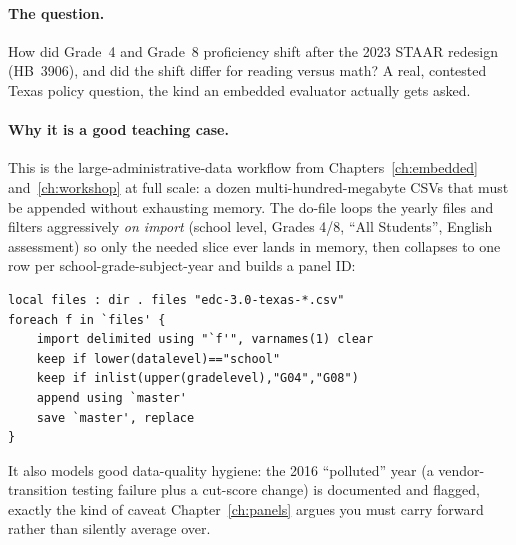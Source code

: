 \documentclass[
    a4paper,
    fontsize=10pt,
    twoside=true,
    numbers=noenddot,
]{kaobook}
\begin{document}
\paragraph{The question.} How did Grade~4 and Grade~8 proficiency shift after the 2023 STAAR redesign (HB~3906), and did the shift differ for reading versus math? A real, contested Texas policy question, the kind an embedded evaluator actually gets asked.

\paragraph{Why it is a good teaching case.} This is the large-administrative-data workflow from Chapters~\ref{ch:embedded} and~\ref{ch:workshop} at full scale: a dozen multi-hundred-megabyte CSVs that must be appended without exhausting memory. The do-file loops the yearly files and filters aggressively \emph{on import} (school level, Grades 4/8, \enquote{All Students}, English assessment) so only the needed slice ever lands in memory, then collapses to one row per school-grade-subject-year and builds a panel ID:
{\footnotesize
\begin{verbatim}
local files : dir . files "edc-3.0-texas-*.csv"
foreach f in `files' {
    import delimited using "`f'", varnames(1) clear
    keep if lower(datalevel)=="school"
    keep if inlist(upper(gradelevel),"G04","G08")
    append using `master'
    save `master', replace
}
\end{verbatim}
}
It also models good data-quality hygiene: the 2016 \enquote{polluted} year (a vendor-transition testing failure plus a cut-score change) is documented and flagged, exactly the kind of caveat Chapter~\ref{ch:panels} argues you must carry forward rather than silently average over.
\end{document}
